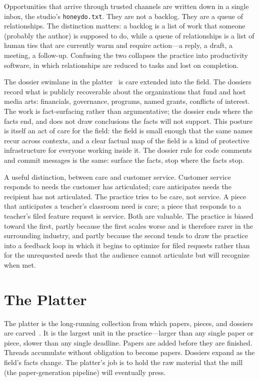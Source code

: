 \documentclass[10pt,letterpaper,twocolumn]{article}
\begin{document}
Opportunities that arrive through trusted channels are written down in a single inbox, the studio's \texttt{honeydo.txt}. They are not a backlog. They are a queue of relationships. The distinction matters: a backlog is a list of work that someone (probably the author) is supposed to do, while a queue of relationships is a list of human ties that are currently warm and require action---a reply, a draft, a meeting, a follow-up. Confusing the two collapses the practice into productivity software, in which relationships are reduced to tasks and lost on completion.

The dossier swimlane in the platter~\citep{scudder2026score} is care extended into the field. The dossiers record what is publicly recoverable about the organizations that fund and host media arts: financials, governance, programs, named grants, conflicts of interest. The work is fact-surfacing rather than argumentative; the dossier ends where the facts end, and does not draw conclusions the facts will not support. This posture is itself an act of care for the field: the field is small enough that the same names recur across contexts, and a clear factual map of the field is a kind of protective infrastructure for everyone working inside it. The dossier rule for code comments and commit messages is the same: surface the facts, stop where the facts stop.

A useful distinction, between care and customer service. Customer service responds to needs the customer has articulated; care anticipates needs the recipient has not articulated. The practice tries to be care, not service. A piece that anticipates a teacher's classroom need is care; a piece that responds to a teacher's filed feature request is service. Both are valuable. The practice is biased toward the first, partly because the first scales worse and is therefore rarer in the surrounding industry, and partly because the second tends to draw the practice into a feedback loop in which it begins to optimize for filed requests rather than for the unrequested needs that the audience cannot articulate but will recognize when met.

\section{The Platter}

The platter is the long-running collection from which papers, pieces, and dossiers are carved~\citep{scudder2026score}. It is the largest unit in the practice---larger than any single paper or piece, slower than any single deadline. Papers are added before they are finished. Threads accumulate without obligation to become papers. Dossiers expand as the field's facts change. The platter's job is to hold the raw material that the mill (the paper-generation pipeline) will eventually press.
\end{document}
